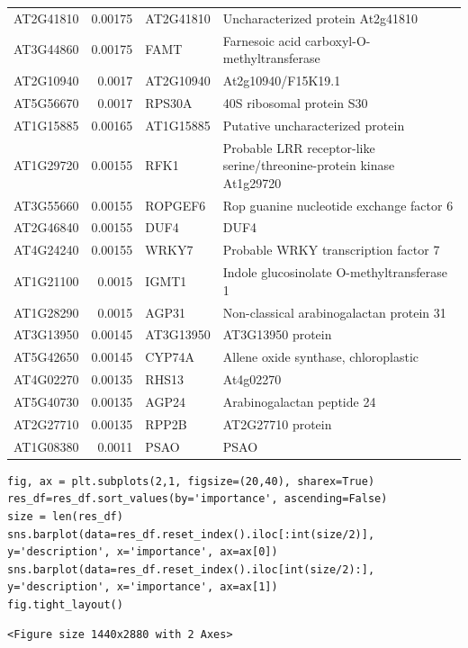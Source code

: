 \documentclass[11pt]{article}
\begin{document}
\begin{center}
\begin{tabular}{lrll}
AT2G41810 & 0.00175 & AT2G41810 & Uncharacterized protein At2g41810\\
AT3G44860 & 0.00175 & FAMT & Farnesoic acid carboxyl-O-methyltransferase\\
AT2G10940 & 0.0017 & AT2G10940 & At2g10940/F15K19.1\\
AT5G56670 & 0.0017 & RPS30A & 40S ribosomal protein S30\\
AT1G15885 & 0.00165 & AT1G15885 & Putative uncharacterized protein\\
AT1G29720 & 0.00155 & RFK1 & Probable LRR receptor-like serine/threonine-protein kinase At1g29720\\
AT3G55660 & 0.00155 & ROPGEF6 & Rop guanine nucleotide exchange factor 6\\
AT2G46840 & 0.00155 & DUF4 & DUF4\\
AT4G24240 & 0.00155 & WRKY7 & Probable WRKY transcription factor 7\\
AT1G21100 & 0.0015 & IGMT1 & Indole glucosinolate O-methyltransferase 1\\
AT1G28290 & 0.0015 & AGP31 & Non-classical arabinogalactan protein 31\\
AT3G13950 & 0.00145 & AT3G13950 & AT3G13950 protein\\
AT5G42650 & 0.00145 & CYP74A & Allene oxide synthase, chloroplastic\\
AT4G02270 & 0.00135 & RHS13 & At4g02270\\
AT5G40730 & 0.00135 & AGP24 & Arabinogalactan peptide 24\\
AT2G27710 & 0.00135 & RPP2B & AT2G27710 protein\\
AT1G08380 & 0.0011 & PSAO & PSAO\\
\end{tabular}
\end{center}

\begin{verbatim}
fig, ax = plt.subplots(2,1, figsize=(20,40), sharex=True)
res_df=res_df.sort_values(by='importance', ascending=False)
size = len(res_df)
sns.barplot(data=res_df.reset_index().iloc[:int(size/2)], y='description', x='importance', ax=ax[0])
sns.barplot(data=res_df.reset_index().iloc[int(size/2):], y='description', x='importance', ax=ax[1])
fig.tight_layout()
\end{verbatim}

\begin{verbatim}
<Figure size 1440x2880 with 2 Axes>
\end{verbatim}
\end{document}
